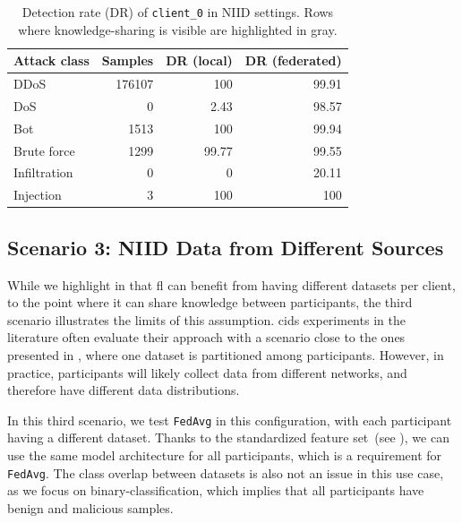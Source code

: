 \begin{table}
    \centering
    \caption{Detection rate (DR) of \texttt{client\_0} in NIID settings. Rows where knowledge-sharing is visible are highlighted in gray.}
    \label{tbl:niidclient}
    \begin{tabular}{l|rrr}
        \toprule
        \textbf{Attack class} & \textbf{Samples} & \textbf{DR (local)} & \textbf{DR (federated)} \\
        \midrule
        DDoS & 176107 & 100 & 99.91 \\
        \rowcolor{lightgray} DoS & 0 & 2.43 & 98.57 \\
        Bot & 1513 & 100 & 99.94 \\
        Brute force & 1299 & 99.77 & 99.55 \\
        \rowcolor{lightgray} Infiltration & 0 & 0 & 20.11 \\
        Injection & 3 & 100 & 100 \\
        \bottomrule
    \end{tabular}
\end{table}



\subsection{Scenario 3: NIID Data from Different Sources\label{sec:demo.heterogeneous}}

While we highlight in  that \gls{fl} can benefit from having different datasets per client, to the point where it can share knowledge between participants, the third scenario illustrates the limits of this assumption.
\Gls{cids} experiments in the literature often evaluate their approach with a scenario close to the ones presented in , where one dataset is partitioned among participants.
However, in practice, participants will likely collect data from different networks, and therefore have different data distributions.

In this third scenario, we test \texttt{FedAvg} in this configuration, with each participant having a different dataset.
Thanks to the standardized feature set~(see ), we can use the same model architecture for all participants, which is a requirement for \texttt{FedAvg}.
The class overlap between datasets is also not an issue in this use case, as we focus on binary-classification, which implies that all participants have benign and malicious samples.


